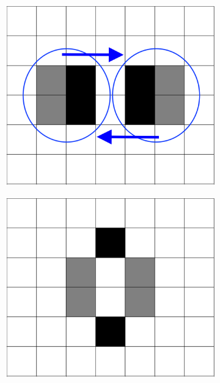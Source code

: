 \documentclass[12pt]{article}
\numberwithin{figure}{section} %
\begin{document}
\begin{figure}[H]
	\centering
	\begin{subfigure}{0.24\textwidth}
     		\centering
     		\includegraphics[width=\linewidth]{Section4/31.0}
     		\subcaption{}
   	\end{subfigure}
    	\begin{subfigure}{0.24\textwidth}
     		\centering
     		\includegraphics[width=\linewidth]{Section4/31.1}

\end{subfigure}
\end{figure}
\end{document}

